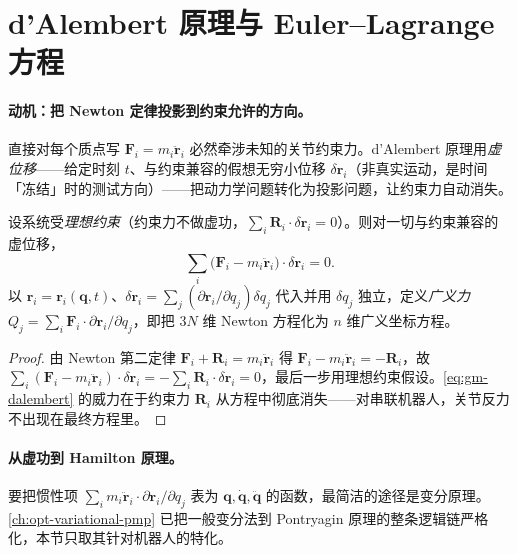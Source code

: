 \section{d'Alembert 原理与 Euler--Lagrange 方程}
\label{sec:gm-el}

\paragraph{动机：把 Newton 定律投影到约束允许的方向。}
直接对每个质点写 $\mathbf F_i=m_i\ddot{\mathbf r}_i$ 必然牵涉未知的关节约束力。d'Alembert 原理用\emph{虚位移}——给定时刻 $t$、与约束兼容的假想无穷小位移 $\delta\mathbf r_i$（非真实运动，是时间「冻结」时的测试方向）——把动力学问题转化为投影问题，让约束力自动消失。

\begin{theorem}\label{thm:gm-dalembert}
设系统受\emph{理想约束}（约束力不做虚功，$\sum_i\mathbf R_i\cdot\delta\mathbf r_i=0$）。则对一切与约束兼容的虚位移，
\begin{equation}
  \sum_i\big(\mathbf F_i-m_i\ddot{\mathbf r}_i\big)\cdot\delta\mathbf r_i=0.
  \label{eq:gm-dalembert}
\end{equation}
以 $\mathbf r_i=\mathbf r_i(\mathbf q,t)$、$\delta\mathbf r_i=\sum_j(\partial\mathbf r_i/\partial q_j)\delta q_j$ 代入并用 $\delta q_j$ 独立，定义\emph{广义力} $Q_j=\sum_i\mathbf F_i\cdot\partial\mathbf r_i/\partial q_j$，即把 $3N$ 维 Newton 方程化为 $n$ 维广义坐标方程。
\end{theorem}

\begin{proof}
由 Newton 第二定律 $\mathbf F_i+\mathbf R_i=m_i\ddot{\mathbf r}_i$ 得 $\mathbf F_i-m_i\ddot{\mathbf r}_i=-\mathbf R_i$，故 $\sum_i(\mathbf F_i-m_i\ddot{\mathbf r}_i)\cdot\delta\mathbf r_i=-\sum_i\mathbf R_i\cdot\delta\mathbf r_i=0$，最后一步用理想约束假设。\cref{eq:gm-dalembert} 的威力在于约束力 $\mathbf R_i$ 从方程中彻底消失——对串联机器人，关节反力不出现在最终方程里。
\end{proof}

\paragraph{从虚功到 Hamilton 原理。}
要把惯性项 $\sum_i m_i\ddot{\mathbf r}_i\cdot\partial\mathbf r_i/\partial q_j$ 表为 $\mathbf q,\dot{\mathbf q},\ddot{\mathbf q}$ 的函数，最简洁的途径是变分原理。\cref{ch:opt-variational-pmp} 已把一般变分法到 Pontryagin 原理的整条逻辑链严格化，本节只取其针对机器人的特化。


